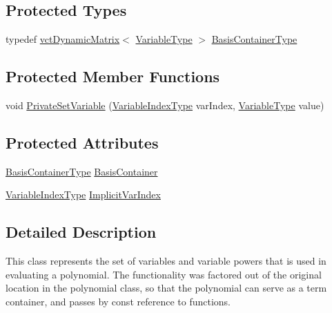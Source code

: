 \subsection*{Protected Types}
\begin{DoxyCompactItemize}
\item 
typedef \hyperlink{classvct_dynamic_matrix}{vct\+Dynamic\+Matrix}$<$ \hyperlink{classnmr_multi_variable_power_basis_a7089007a79cce8d2eb3672e2d61af06c}{Variable\+Type} $>$ \hyperlink{classnmr_multi_variable_power_basis_ac85dc969184c15d34dd849c4cbd04180}{Basis\+Container\+Type}
\end{DoxyCompactItemize}
\subsection*{Protected Member Functions}
\begin{DoxyCompactItemize}
\item 
void \hyperlink{classnmr_multi_variable_power_basis_a114e29d0c22b8652479f0b119ed74974}{Private\+Set\+Variable} (\hyperlink{classnmr_multi_variable_power_basis_ae125326a623043fcfd020aeeefd1cce6}{Variable\+Index\+Type} var\+Index, \hyperlink{classnmr_multi_variable_power_basis_a7089007a79cce8d2eb3672e2d61af06c}{Variable\+Type} value)
\end{DoxyCompactItemize}
\subsection*{Protected Attributes}
\begin{DoxyCompactItemize}
\item 
\hyperlink{classnmr_multi_variable_power_basis_ac85dc969184c15d34dd849c4cbd04180}{Basis\+Container\+Type} \hyperlink{classnmr_multi_variable_power_basis_ab3a42fd570e56f493446698ddf5dcb76}{Basis\+Container}
\item 
\hyperlink{classnmr_multi_variable_power_basis_ae125326a623043fcfd020aeeefd1cce6}{Variable\+Index\+Type} \hyperlink{classnmr_multi_variable_power_basis_a57dbcaaf1e35dabe83b0aa0a01e8b8e4}{Implicit\+Var\+Index}
\end{DoxyCompactItemize}


\subsection{Detailed Description}
This class represents the set of variables and variable powers that is used in evaluating a polynomial. The functionality was factored out of the original location in the polynomial class, so that the polynomial can serve as a term container, and passes by const reference to functions.

